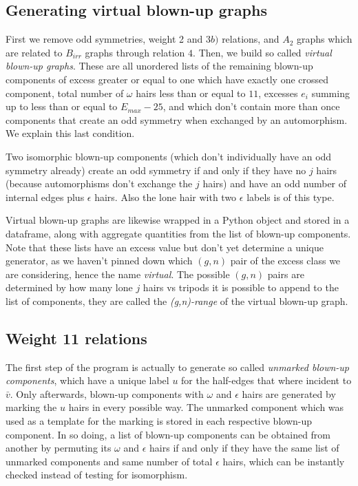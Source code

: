 \subsection{Generating virtual blown-up graphs}  First we remove odd symmetries, weight 2 and $3b)$ relations, and $A_2$ graphs which are related to $B_{irr}$ graphs through relation $4$. Then, we build so called \textit{virtual blown-up graphs}. These are all unordered lists of the remaining blown-up components of excess greater or equal to one which have exactly one crossed component, total number of $\omega$ hairs less than or equal to $11$, excesses $e_i$ summing up to less than or equal to $E_{max}-25$, and which don't contain more than once components that create an odd symmetry when exchanged by an automorphism. We explain this last condition.

Two isomorphic blown-up components (which don't individually have an odd symmetry already) create an odd symmetry if and only if they have no $j$ hairs (because automorphisms don't exchange the $j$ hairs) and have an odd number of internal edges plus $\epsilon$ hairs. Also the lone hair with two $\epsilon$ labels is of this type.

Virtual blown-up graphs are likewise wrapped in a Python object and stored in a dataframe, along with aggregate quantities from the list of blown-up components. Note that these lists have an excess value but don't yet determine a unique generator, as we haven't pinned down which $(g,n)$ pair of the excess class we are considering, hence the name \textit{virtual}. The possible $(g,n)$ pairs are determined by how many lone $j$ hairs vs tripods it is possible to append to the list of components, they are called the \textit{(g,n)-range} of the virtual blown-up graph.



\subsection{Weight 11 relations} The first step of the program is actually to generate so called \textit{unmarked blown-up components}, which have a unique label $u$ for the half-edges that where incident to $\bar{v}$. Only afterwards, blown-up components with $\omega$ and $\epsilon$ hairs are generated by marking the $u$ hairs in every possible way. The unmarked component which was used as a template for the marking is stored in each respective blown-up component. In so doing, a list of blown-up components can be obtained from another by permuting its $\omega$ and $\epsilon$ hairs if and only if they have the same list of unmarked components and same number of total $\epsilon$ hairs, which can be instantly checked instead of testing for isomorphism.


